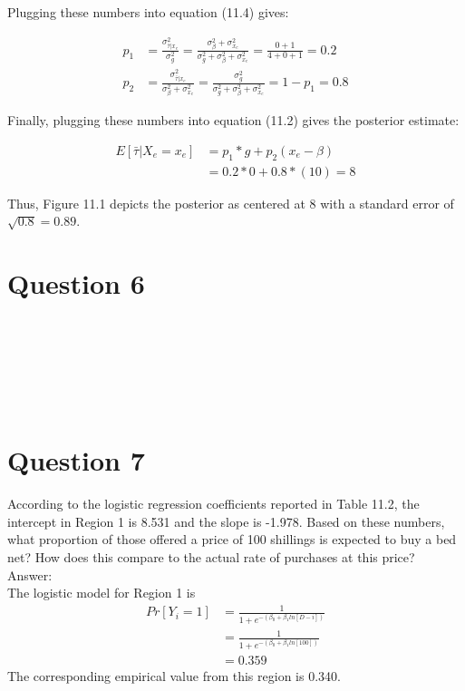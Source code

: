 \documentclass[11pt,notitlepage]{article}\usepackage[]{graphicx}\usepackage[]{color}
\makeatletter
\newenvironment{kframe}{%
 \def\at@end@of@kframe{}%
 \ifinner\ifhmode%
  \def\at@end@of@kframe{\end{minipage}}%
  \begin{minipage}{\columnwidth}%
 \fi\fi%
 \def\FrameCommand##1{\hskip\@totalleftmargin \hskip-\fboxsep
 \colorbox{shadecolor}{##1}\hskip-\fboxsep
     \hskip-\linewidth \hskip-\@totalleftmargin \hskip\columnwidth}%
 \MakeFramed {\advance\hsize-\width
   \@totalleftmargin\z@ \linewidth\hsize
   \@setminipage}}%
 {\par\unskip\endMakeFramed%
 \at@end@of@kframe}
\newenvironment{knitrout}{}{} %
\makeatother
\begin{document}
Plugging these numbers into equation (11.4) gives: 

\begin{align*}
p_1 &= \frac{\sigma^2_{\bar{\tau}|x_e}}{\sigma^2_g} = \frac{\sigma^2_{\beta} + \sigma^2_{x_e}}{\sigma^2_g +\sigma^2_{\beta} + \sigma^2_{x_e}} = \frac{0+1}{4+0+1} = 0.2\\
p_2 &= \frac{\sigma^2_{\bar{\tau}|x_e}}{\sigma^2_{\beta} + \sigma^2_{x_e}} = \frac{\sigma^2_g}{\sigma^2_g +\sigma^2_{\beta} + \sigma^2_{x_e}} = 1 - p_1 = 0.8
\end{align*}

Finally, plugging these numbers into equation (11.2) gives the posterior estimate:

\begin{align*}
E[\bar{\tau}|X_e = x_e] &= p_1*g + p_2(x_e - \beta) \\
&= 0.2 * 0 + 0.8*(10) = 8
\end{align*}

Thus, Figure 11.1 depicts the posterior as centered at 8 with a standard error of $\sqrt{0.8}=0.89$.

\section*{Question 6}
\begin{knitrout}
\color{fgcolor}\begin{kframe}
\begin{verbatim}






\end{verbatim}
\end{kframe}
\end{knitrout}


\section*{Question 7}
According to the logistic regression coefficients reported in Table 11.2, the intercept in Region 1 is 8.531 and the slope is -1.978. Based on these numbers, what proportion of those offered a price of 100 shillings is expected to buy a bed net? How does this compare to the actual rate of purchases at this price?\\
Answer:\\
The logistic model for Region 1 is 
\begin{align*}
Pr[Y_i=1] &= \frac{1}{1+e^{-(\beta_0 + \beta_1 ln[D-i])}}\\
&= \frac{1}{1+e^{-(\beta_0 + \beta_1 ln[100])}}\\
&=0.359
\end{align*}
The corresponding empirical value from this region is 0.340.
\end{document}
